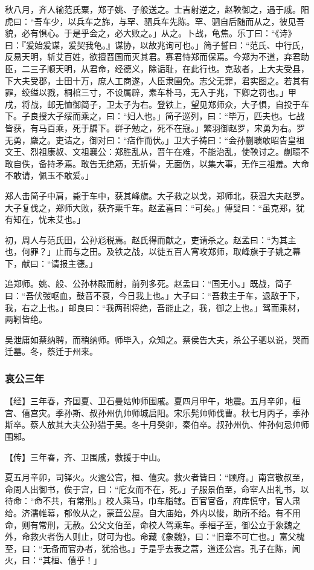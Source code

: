 \documentclass[]{article}
\begin{document}
秋八月，齐人输范氏粟，郑子姚、子般送之。士吉射逆之，赵鞅御之，遇于戚。阳虎曰：``吾车少，以兵车之旆，与罕、驷兵车先陈。罕、驷自后随而从之，彼见吾貌，必有惧心。于是乎会之，必大败之。」从之。卜战，龟焦。乐丁曰：``《诗》曰：『爰始爰谋，爰契我龟。』谋协，以故兆询可也。」简子誓曰：``范氏、中行氏，反易天明，斩艾百姓，欲擅晋国而灭其君。寡君恃郑而保焉。今郑为不道，弃君助臣，二三子顺天明，从君命，经德义，除诟耻，在此行也。克敌者，上大夫受县，下大夫受郡，士田十万，庶人工商遂，人臣隶圉免。志父无罪，君实图之。若其有罪，绞缢以戮，桐棺三寸，不设属辟，素车朴马，无入于兆，下卿之罚也。」甲戌，将战，邮无恤御简子，卫太子为右。登铁上，望见郑师众，大子惧，自投于车下。子良授大子绥而乘之，曰：``妇人也。」简子巡列，曰：``毕万，匹夫也。七战皆获，有马百乘，死于牖下。群子勉之，死不在寇。」繁羽御赵罗，宋勇为右。罗无勇，麇之。吏诘之，御对曰：``痁作而伏。」卫大子祷曰：``会孙蒯聩敢昭告皇祖文王、烈祖康叔、文祖襄公：郑胜乱从，晋午在难，不能治乱，使鞅讨之。蒯聩不敢自佚，备持矛焉。敢告无绝筋，无折骨，无面伤，以集大事，无作三祖羞。大命不敢请，佩玉不敢爱。」

郑人击简子中肩，毙于车中，获其峰旗。大子救之以戈，郑师北，获温大夫赵罗。大子复伐之，郑师大败，获齐粟千车。赵孟喜曰：``可矣。」傅叟曰：``虽克郑，犹有知在，忧未艾也。」

初，周人与范氏田，公孙尨税焉。赵氏得而献之，吏请杀之。赵孟曰：``为其主也，何罪？」止而与之田。及铁之战，以徒五百人宵攻郑师，取峰旗于子姚之幕下，献曰：``请报主德。」

追郑师。姚、般、公孙林殿而射，前列多死。赵孟曰：``国无小。」既战，简子曰：``吾伏弢呕血，鼓音不衰，今日我上也。」大子曰：``吾救主于车，退敌于下，我，右之上也。」邮良曰：``我两靷将绝，吾能止之，我，御之上也。」驾而乘材，两靷皆绝。

吴泄庸如蔡纳聘，而稍纳师。师毕入，众知之。蔡侯告大夫，杀公子驷以说，哭而迁墓。冬，蔡迁于州来。

\hypertarget{header-n3069}{%
\subsubsection{哀公三年}\label{header-n3069}}

【经】三年春，齐国夏、卫石曼姑帅师围戚。夏四月甲午，地震。五月辛卯，桓宫、僖宫灾。季孙斯、叔孙州仇帅师城启阳。宋乐髡帅师伐曹。秋七月丙子，季孙斯卒。蔡人放其大夫公孙猎于吴。冬十月癸卯，秦伯卒。叔孙州仇、仲孙何忌帅师围邾。

【传】三年春，齐、卫围戚，救援于中山。

夏五月辛卯，司铎火。火逾公宫，桓、僖灾。救火者皆曰：``顾府。」南宫敬叔至，命周人出御书，俟于宫，曰：``庀女而不在，死。」子服景伯至，命宰人出礼书，以待命：``命不共，有常刑。」校人乘马，巾车脂辖。百官官备，府库慎守，官人肃给。济濡帷幕，郁攸从之，蒙葺公屋。自大庙始，外内以悛，助所不给。有不用命，则有常刑，无赦。公父文伯至，命校人驾乘车。季桓子至，御公立于象魏之外，命救火者伤人则止，财可为也。命藏《象魏》，曰：``旧章不可亡也。」富父槐至，曰：``无备而官办者，犹拾也。」于是乎去表之蒿，道还公宫。孔子在陈，闻火，曰：``其桓、僖乎！」
\end{document}
